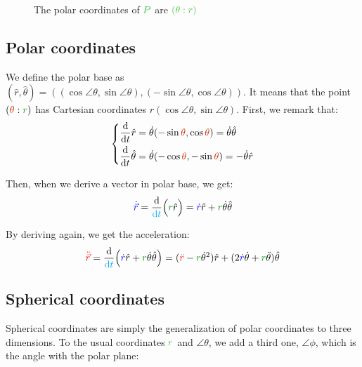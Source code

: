 \begin{figure}[H]
	\centering
	\caption{The polar coordinates of $\posit{P}$ are $\posit{(\theta:r)}$}
\end{figure}


\subsection{Polar coordinates}

We define the polar base as $(\hat r, \hat \theta) = ((\cos
\angle{\theta}, \sin \angle{\theta}), (-\sin \angle{\theta}, \cos
\angle{\theta}))$. It means that the point $(\angle{\theta}:\dist{r})$
has Cartesian coordinates $r(\cos \angle{\theta}, \sin
\angle{\theta})$. First, we remark that:
\[
\left\{
\begin{aligned}
\frac {\d} {\dt} \hat r      &= \dot \theta (- \sin \angle{\theta},   \cos \angle{\theta}) = \dot \theta \hat \theta \\
\frac {\d} {\dt} \hat \theta &= \dot \theta (- \cos \angle{\theta}, - \sin \angle{\theta}) = - \dot \theta \hat r \\
\end{aligned}
\right.
\]

Then, when we derive a vector in polar base, we get:
\[
\speed{\dot {\vec r}}
= \frac {\d} {\delay{\dt}} \Big(\dist{r} \hat r\Big)
= \speed{\dot r} \hat r + \dist{r} \dot \theta \hat \theta
\]

By deriving again, we get the acceleration:
\[
\accel{\ddot {\vec r}}
= \frac {\d} {\delay{\dt}} \Big(\speed{\dot r} \hat r + \dist{r} \dot \theta \hat \theta\Big)
= (\accel{\ddot r} - \dist{r} {\dot \theta}^2) \hat r
  + (2 \speed{\dot r} \dot \theta + \dist{r} \ddot \theta) \hat \theta
\]


\subsection{Spherical coordinates}

Spherical coordinates are simply the generalization of polar
coordinates to three dimensions. To the usual coordinates $\posit{r}$
and $\angle{\theta}$, we add a third one, $\angle{\phi}$, which is the
angle with the polar plane:

